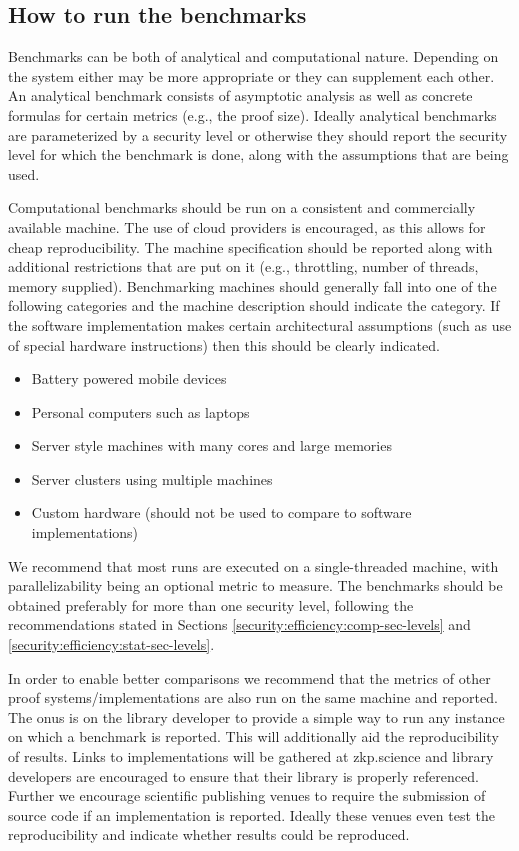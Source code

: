 \subsection{How to run the benchmarks}
\label{implem:benchmarks:how-to-run}

Benchmarks can be both of analytical and computational nature.
Depending on the system either may be more appropriate or they can supplement each other.
An analytical benchmark consists of asymptotic analysis as well as concrete formulas for certain metrics (e.g., the proof size).
Ideally analytical benchmarks are parameterized by a security level or otherwise they should report the security level for which the benchmark is done, along with the assumptions that are being used.

Computational benchmarks should be run on a consistent and commercially available machine.
The use of cloud providers is encouraged, as this allows for cheap reproducibility.
The machine specification should be reported along with additional restrictions that are put on it (e.g., throttling, number of threads, memory supplied).
Benchmarking machines should generally fall into one of the following categories and the machine description should indicate the category.
If the software implementation makes certain architectural assumptions (such as use of special hardware instructions) then this should be clearly indicated.

\begin{itemize}
    \item Battery powered mobile devices
    \item Personal computers such as laptops
    \item Server style machines with many cores and large memories
    \item Server clusters using multiple machines 
    \item Custom hardware (should not be used to compare to software implementations)
\end{itemize}


We recommend that most runs are executed on a single-threaded machine, with parallelizability being an optional metric to measure. 
The benchmarks should be obtained preferably for more than one security level, following the recommendations stated in Sections \ref{security:efficiency:comp-sec-levels} and \ref{security:efficiency:stat-sec-levels}.


In order to enable better comparisons we recommend that the metrics of other proof systems\slash implementations are also run on the same machine and reported. The onus is on the library developer to provide a simple way to run any instance on which a benchmark is reported.
This will additionally aid the reproducibility of results.
Links to implementations will be gathered at zkp.science and library developers are encouraged to ensure that their library is properly referenced.
Further we encourage scientific publishing venues to require the submission of source code if an implementation is reported.
Ideally these venues even test the reproducibility and indicate whether results could be reproduced.


